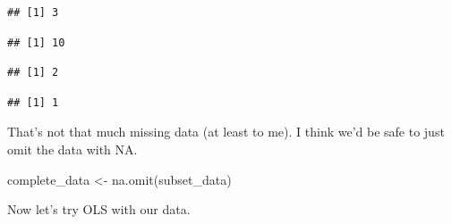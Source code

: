 \documentclass[
]{article}
\newenvironment{Shaded}{\begin{snugshade}}{\end{snugshade}}
\newcommand{\FunctionTok}[1]{\textcolor[rgb]{0.00,0.00,0.00}{#1}}
\newcommand{\NormalTok}[1]{#1}
\newcommand{\OtherTok}[1]{\textcolor[rgb]{0.56,0.35,0.01}{#1}}
\newcommand{\SpecialCharTok}[1]{\textcolor[rgb]{0.00,0.00,0.00}{#1}}
\begin{document}
\begin{verbatim}
## [1] 3
\end{verbatim}

\begin{Shaded}
\end{Shaded}

\begin{verbatim}
## [1] 10
\end{verbatim}

\begin{Shaded}
\end{Shaded}

\begin{verbatim}
## [1] 2
\end{verbatim}

\begin{Shaded}
\end{Shaded}

\begin{verbatim}
## [1] 1
\end{verbatim}

That's not that much missing data (at least to me). I think we'd be safe
to just omit the data with NA.

\begin{Shaded}
\begin{Highlighting}[]
\NormalTok{complete\_data }\OtherTok{\textless{}{-}} \FunctionTok{na.omit}\NormalTok{(subset\_data)}
\end{Highlighting}
\end{Shaded}

Now let's try OLS with our data.
\end{document}
